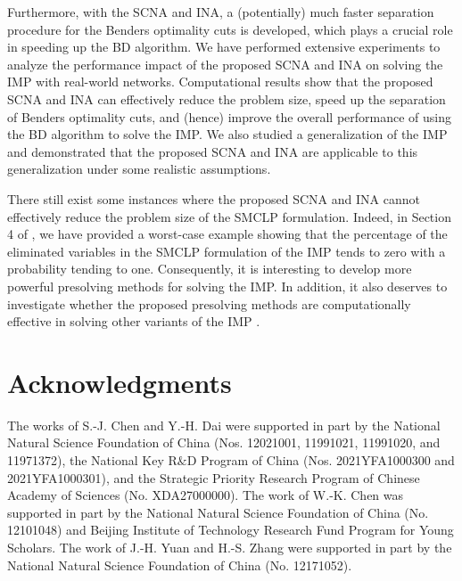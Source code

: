 \documentclass[a4paper,10pt]{article}
\theoremstyle{plain}
\newcommand{\revv}[1]{{#1}}
\begin{document}
	Furthermore, with the SCNA and INA, a (potentially) much faster separation procedure for the Benders optimality cuts is developed, which plays a crucial role in speeding up the BD algorithm. 
	We have performed extensive experiments to analyze the performance impact of the proposed SCNA and INA on solving the IMP with real-world \revv{networks}. 
	Computational results show that the proposed SCNA and INA can effectively reduce the problem size\revv{, speed up the separation of Benders optimality cuts, 
		and (hence) improve the \revv{overall} performance of using the BD algorithm to solve the IMP.}
	We also studied a generalization of the IMP and demonstrated that the proposed \revv{SCNA and INA} are applicable to this generalization under some realistic assumptions. 
	
	
	There still exist some instances where the proposed SCNA and INA cannot effectively reduce the problem size of the SMCLP formulation.
	Indeed, in \revv{Section 4}  of \cite{Chen2022}, we have provided a worst-case example showing that the percentage of the eliminated variables in the SMCLP formulation of the IMP tends to zero with a probability tending to one.
	Consequently, it is interesting to develop more powerful presolving methods for solving the IMP. 
	In addition, it also deserves to investigate
	whether the proposed presolving methods are computationally effective in solving other variants of the IMP \cite{Long2011,nguyen2013budgeted,Wu2019,Zhang2014}.\\[5pt]
	\section*{Acknowledgments} 
	The works of S.-J. Chen and Y.-H. Dai were supported in part by  the National Natural Science Foundation of China (Nos.  12021001, 11991021, 11991020, and 11971372), the National Key  R$\&$D Program of China (Nos. 2021YFA1000300 and 2021YFA1000301), and the Strategic Priority Research Program of Chinese Academy of Sciences (No. XDA27000000).
	The work of W.-K. Chen was supported in part by the National Natural Science Foundation of China (No. 12101048) and Beijing Institute of Technology Research Fund Program for Young Scholars.
	The work of J.-H. Yuan and H.-S. Zhang were supported in part by the National Natural Science Foundation of China (No. 12171052).
\end{document}
